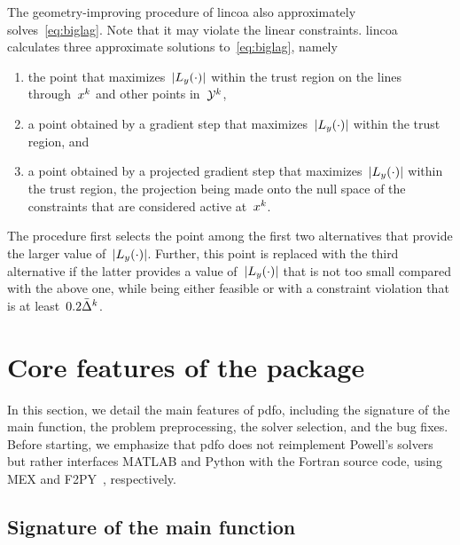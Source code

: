 The geometry-improving procedure of \gls{lincoa} also approximately solves~\cref{eq:biglag}.
Note that it may violate the linear constraints.
\Gls{lincoa} calculates three approximate solutions to~\cref{eq:biglag}, namely
\begin{enumerate}
    \item the point that maximizes~$\abs{\lagp[y](\cdot)}$ within the trust region on the lines through~$\iter[k]$ and other points in~$\xpt[k]$,
    \item a point obtained by a gradient step that maximizes~$\abs{\lagp[y](\cdot)}$ within the trust region, and
    \item a point obtained by a projected gradient step that maximizes~$\abs{\lagp[y](\cdot)}$ within the trust region, the projection being made onto the null space of the constraints that are considered active at~$\iter[k]$.
\end{enumerate}
The procedure first selects the point among the first two alternatives that provide the larger value of~$\abs{\lagp[y](\cdot)}$.
Further, this point is replaced with the third alternative if the latter provides a value of~$\abs{\lagp[y](\cdot)}$ that is not too small compared with the above one, while being either feasible or with a constraint violation that is at least~$0.2 \bar{\rad}^k$.

\section{Core features of the  package}
\label{sec:pdfo-core-features}

In this section, we detail the main features of \gls{pdfo}, including the signature of the main function, the problem preprocessing, the solver selection, and the bug fixes.
Before starting, we emphasize that \gls{pdfo} does not reimplement Powell's solvers but rather interfaces MATLAB and Python with the Fortran source code, using MEX and F2PY~\cite{Peterson_2009}, respectively.

\subsection{Signature of the main function}

